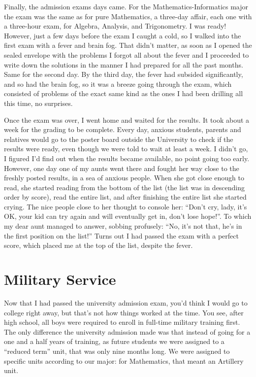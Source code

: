 \documentclass[12pt]{book}
\begin{document}
Finally, the admission exams days came. For the Mathematics-Informatics
major the exam was the same as for pure Mathematics, a three-day affair,
each one with a three-hour exam, for Algebra, Analysis, and
Trigonometry. I was ready! However, just a few days before the exam I
caught a cold, so I walked into the first exam with a fever and brain
fog. That didn't matter, as soon as I opened the sealed envelope with
the problems I forgot all about the fever and I proceeded to write down
the solutions in the manner I had prepared for all the past months. Same
for the second day. By the third day, the fever had subsided
significantly, and so had the brain fog, so it was a breeze going
through the exam, which consisted of problems of the exact same kind as
the ones I had been drilling all this time, no surprises.

Once the exam was over, I went home and waited for the results. It took
about a week for the grading to be complete. Every day, anxious
students, parents and relatives would go to the poster board outside the
University to check if the results were ready, even though we were told
to wait at least a week. I didn't go, I figured I'd find out when the
results became available, no point going too early. However, one day one
of my aunts went there and fought her way close to the freshly posted
results, in a sea of anxious people. When she got close enough to read,
she started reading from the bottom of the list (the list was in
descending order by score), read the entire list, and after finishing
the entire list she started crying. The nice people close to her thought
to console her: ``Don't cry, lady, it's OK, your kid can try again and
will eventually get in, don't lose hope!''. To which my dear aunt
managed to answer, sobbing profusely: ``No, it's not that, he's in the
first position on the list!'' Turns out I had passed the exam with a
perfect score, which placed me at the top of the list, despite the
fever.


\section{Military Service}

Now that I had passed the university admission exam, you'd think I would
go to college right away, but that's not how things worked at the time.
You see, after high school, all boys were required to enroll in
full-time military training first. The only difference the university
admission made was that instead of going for a one and a half years of
training, as future students we were assigned to a ``reduced term''
unit, that was only nine months long. We were assigned to specific units
according to our major: for Mathematics, that meant an Artillery unit.
\end{document}
